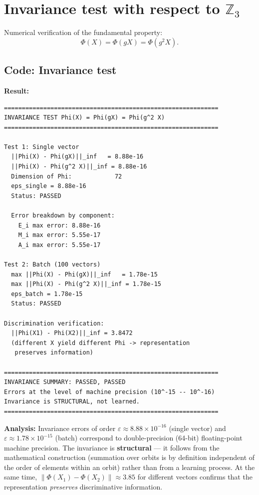 \documentclass[11pt,a4paper]{report}
\begin{document}

\section{Invariance test with respect to $\mathbb{Z}_3$}

Numerical verification of the fundamental property:
\[
\Phi(X) = \Phi(gX) = \Phi(g^2 X).
\]

\subsection{Code: Invariance test}

\noindent{}


\textbf{Result:}
\begin{verbatim}
============================================================
INVARIANCE TEST Phi(X) = Phi(gX) = Phi(g^2 X)
============================================================

Test 1: Single vector
  ||Phi(X) - Phi(gX)||_inf   = 8.88e-16
  ||Phi(X) - Phi(g^2 X)||_inf = 8.88e-16
  Dimension of Phi:            72
  eps_single = 8.88e-16
  Status: PASSED

  Error breakdown by component:
    E_i max error: 8.88e-16
    M_i max error: 5.55e-17
    A_i max error: 5.55e-17

Test 2: Batch (100 vectors)
  max ||Phi(X) - Phi(gX)||_inf   = 1.78e-15
  max ||Phi(X) - Phi(g^2 X)||_inf = 1.78e-15
  eps_batch = 1.78e-15
  Status: PASSED

Discrimination verification:
  ||Phi(X1) - Phi(X2)||_inf = 3.8472
  (different X yield different Phi -> representation
   preserves information)

============================================================
INVARIANCE SUMMARY: PASSED, PASSED
Errors at the level of machine precision (10^-15 -- 10^-16)
Invariance is STRUCTURAL, not learned.
============================================================
\end{verbatim}

\textbf{Analysis:} Invariance errors of order $\varepsilon \approx 8.88\times 10^{-16}$ (single vector) and $\varepsilon \approx 1.78\times 10^{-15}$ (batch) correspond to double-precision (64-bit) floating-point machine precision. The invariance is \textbf{structural} --- it follows from the mathematical construction (summation over orbits is by definition independent of the order of elements within an orbit) rather than from a learning process. At the same time, $\|\Phi(X_1) - \Phi(X_2)\| \approx 3.85$ for different vectors confirms that the representation \emph{preserves} discriminative information.
\end{document}
